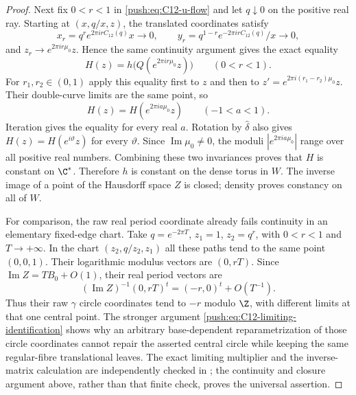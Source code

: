 \begin{proof}
Next fix $0<r<1$ in \eqref{push:eq:C12-u-flow} and let $q\downarrow0$
on the positive real ray. Starting at $(x,q/x,z)$, the translated
coordinates satisfy
\[
 x_r=q^r e^{2\pi i r C_{12}(q)}x\longrightarrow0,\qquad
 y_r=q^{1-r} e^{-2\pi i r C_{12}(q)}/x\longrightarrow0,
\]
and $z_r\longrightarrow e^{2\pi i r\mu_0}z$. Hence the same
continuity argument gives the exact equality
\begin{equation}\label{push:eq:C12-limiting-identification}
 H(z)=h\bigl(Q(e^{2\pi i r\mu_0}z)\bigr)
 \qquad(0<r<1).
\end{equation}
For $r_1,r_2\in(0,1)$ apply this equality first to $z$ and
then to $z'=e^{2\pi i(r_1-r_2)\mu_0}z$. Their double-curve
limits are the same point, so
\[
 H(z)=H(e^{2\pi i a\mu_0}z)\qquad(-1<a<1).
\]
Iteration gives the equality for every real $a$. Rotation by
$\widehat\delta$ also gives $H(z)=H(e^{i\vartheta}z)$ for every
$\vartheta$. Since $\operatorname{Im}\mu_0\ne0$, the moduli
$|e^{2\pi i a\mu_0}|$ range over all positive real numbers.
Combining these two invariances proves that $H$ is constant on
$\C^*$. Therefore $h$ is constant on the dense torus in $W$.
The inverse image of a point of the Hausdorff space $Z$ is
closed; density proves constancy on all of $W$.

For comparison, the raw real period coordinate already fails
continuity in an elementary fixed-edge chart. Take
$q=e^{-2\pi T}$, $z_1=1$, $z_2=q^r$, with $0<r<1$ and
$T\to+\infty$. In the chart
$(z_2,q/z_2,z_1)$ all these paths tend to the same point
$(0,0,1)$. Their logarithmic modulus vectors are $(0,rT)$.
Since $\operatorname{Im}Z=TB_0+O(1)$, their real period
vectors are
\[
 (\operatorname{Im}Z)^{-1}(0,rT)^t
                  =(-r,0)^t+O(T^{-1}).
\]
Thus their raw $\gamma$ circle coordinates tend to $-r$ modulo
$\Z$, with different limits at that one central point. The
stronger argument \eqref{push:eq:C12-limiting-identification} shows
why an arbitrary base-dependent reparametrization of those
circle coordinates cannot repair the asserted central circle
while keeping the same regular-fibre translational leaves.
The exact limiting multiplier and the inverse-matrix calculation
are independently checked in
; the continuity
and closure argument above, rather than that finite check,
proves the universal assertion.
\end{proof}
